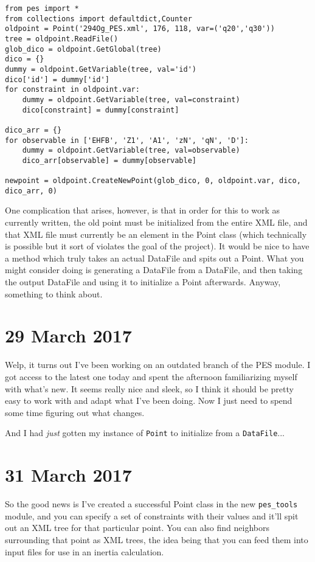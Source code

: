 \documentclass[]{report}
\begin{document}
\begin{verbatim}
from pes import * 
from collections import defaultdict,Counter
oldpoint = Point('294Og_PES.xml', 176, 118, var=('q20','q30'))
tree = oldpoint.ReadFile()
glob_dico = oldpoint.GetGlobal(tree)
dico = {}
dummy = oldpoint.GetVariable(tree, val='id')
dico['id'] = dummy['id']
for constraint in oldpoint.var:
	dummy = oldpoint.GetVariable(tree, val=constraint)
	dico[constraint] = dummy[constraint]
	
dico_arr = {}
for observable in ['EHFB', 'Z1', 'A1', 'zN', 'qN', 'D']:
	dummy = oldpoint.GetVariable(tree, val=observable)
	dico_arr[observable] = dummy[observable]
	
newpoint = oldpoint.CreateNewPoint(glob_dico, 0, oldpoint.var, dico, dico_arr, 0)
\end{verbatim}

One complication that arises, however, is that in order for this to work as currently written, the old point must be initialized from the entire XML file, and that XML file must currently be an element in the Point class (which technically is possible but it sort of violates the goal of the project). It would be nice to have a method which truly takes an actual DataFile and spits out a Point. What you might consider doing is generating a DataFile from a DataFile, and then taking the output DataFile and using it to initialize a Point afterwards. Anyway, something to think about.

\section*{29 March 2017}

Welp, it turns out I've been working on an outdated branch of the PES module. I got access to the latest one today and spent the afternoon familiarizing myself with what's new. It seems really nice and sleek, so I think it should be pretty easy to work with and adapt what I've been doing. Now I just need to spend some time figuring out what changes.

And I had \textit{just} gotten my instance of \texttt{Point} to initialize from a \texttt{DataFile}...

\section*{31 March 2017}

So the good news is I've created a successful Point class in the new \texttt{pes\_tools} module, and you can specify a set of constraints with their values and it'll spit out an XML tree for that particular point. You can also find neighbors surrounding that point as XML trees, the idea being that you can feed them into input files for use in an inertia calculation.
\end{document}
